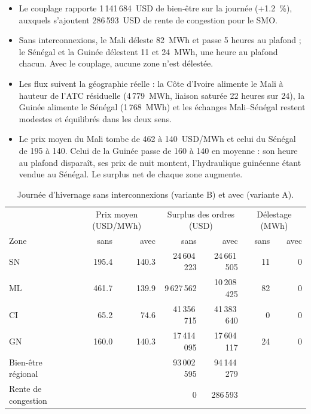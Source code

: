 \documentclass[a4paper,12pt]{article}
\renewcommand{\arraystretch}{1.25}
\theoremstyle{definition}
\begin{document}
\begin{itemize}
\item Le couplage rapporte 1\,141\,684~USD de bien-être sur la journée (+1.2~\%), auxquels s'ajoutent 286\,593~USD de rente de congestion pour le SMO.
\item Sans interconnexions, le Mali déleste 82~MWh et passe 5 heures au plafond ; le Sénégal et la Guinée délestent 11 et 24~MWh, une heure au plafond chacun. Avec le couplage, aucune zone n'est délestée.
\item Les flux suivent la géographie réelle : la Côte d'Ivoire alimente le Mali à hauteur de l'ATC résiduelle (4\,779~MWh, liaison saturée 22 heures sur 24), la Guinée alimente le Sénégal (1\,768~MWh) et les échanges Mali--Sénégal restent modestes et équilibrés dans les deux sens.
\item Le prix moyen du Mali tombe de 462 à 140~USD/MWh et celui du Sénégal de 195 à 140. Celui de la Guinée passe de 160 à 140 en moyenne : son heure au plafond disparaît, ses prix de nuit montent, l'hydraulique guinéenne étant vendue au Sénégal. Le surplus net de chaque zone augmente.
\end{itemize}

\begin{table}[H]
\centering\small\setlength{\tabcolsep}{7pt}\renewcommand{\arraystretch}{1.3}
\begin{tabular}{lrrrrrr}
\toprule
 & \multicolumn{2}{c}{Prix moyen (USD/MWh)} & \multicolumn{2}{c}{Surplus des ordres (USD)} & \multicolumn{2}{c}{Délestage (MWh)} \\
Zone & sans & avec & sans & avec & sans & avec \\
\midrule\addlinespace[2pt]
SN & 195.4 & 140.3 & 24\,604\,223 & 24\,661\,505 & 11 & 0 \\
ML & 461.7 & 139.9 & 9\,627\,562 & 10\,208\,425 & 82 & 0 \\
CI & 65.2 & 74.6 & 41\,356\,715 & 41\,383\,640 & 0 & 0 \\
GN & 160.0 & 140.3 & 17\,414\,095 & 17\,604\,117 & 24 & 0 \\\addlinespace[2pt]
\midrule\addlinespace[2pt]
Bien-être régional & & & 93\,002\,595 & 94\,144\,279 & & \\
Rente de congestion & & & 0 & 286\,593 & & \\
\bottomrule
\end{tabular}
\caption{Journée d'hivernage sans interconnexions (variante B) et avec (variante A).}
\label{tab:application}
\end{table}
\end{document}

